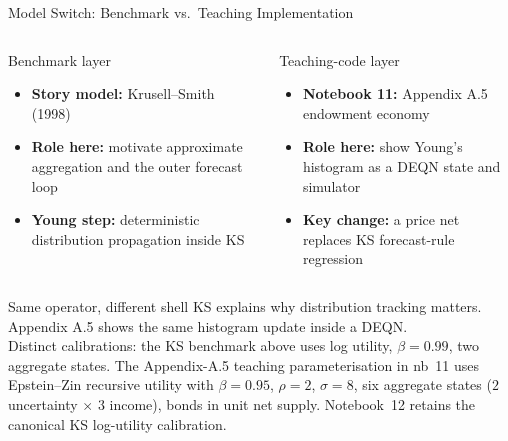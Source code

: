 \documentclass[aspectratio=169,11pt]{beamer}
\newcommand{\emphc}[1]{\textcolor{harvardcrimson}{#1}}
\begin{document}
\begin{frame}[shrink=18]{Model Switch: Benchmark vs.\ Teaching Implementation}
\footnotesize
\begin{columns}[T]
\begin{block}{Benchmark layer}
\begin{itemize}\itemsep1pt
    \item \textbf{Story model:} Krusell--Smith (1998)
    \item \textbf{Role here:} motivate approximate aggregation and the outer forecast loop
    \item \textbf{Young step:} deterministic distribution propagation inside KS
\end{itemize}
\end{block}

\begin{block}{Teaching-code layer}
\begin{itemize}\itemsep1pt
    \item \textbf{Notebook 11:} Appendix A.5 endowment economy
    \item \textbf{Role here:} show Young's histogram as a DEQN state and simulator
    \item \textbf{Key change:} a price net replaces KS forecast-rule regression
\end{itemize}
\end{block}
\end{columns}

\vspace{0.25em}
\begin{alertblock}{Same operator, different shell}
KS explains \emphc{why} distribution tracking matters. Appendix A.5 shows the same histogram update \emphc{inside} a DEQN.\\[2pt]
\emphc{Distinct calibrations}: the KS benchmark above uses log utility, $\beta=0.99$, two aggregate states.  The Appendix-A.5 teaching parameterisation in nb~11 uses Epstein--Zin recursive utility with $\beta=0.95$, $\rho=2$, $\sigma=8$, six aggregate states ($2$ uncertainty $\times$ $3$ income), bonds in unit net supply.  Notebook~12 retains the canonical KS log-utility calibration.
\end{alertblock}
\end{frame}
\end{document}
